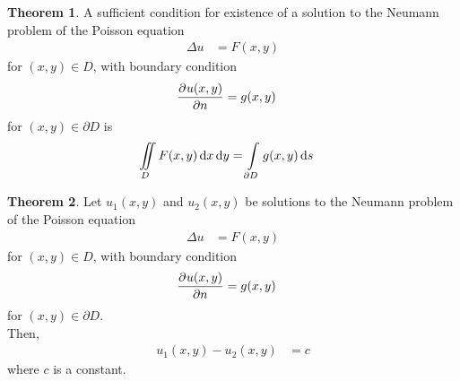 \documentclass[titlepage, fleqn, a4paper, 12pt, twoside]{article}
\theoremstyle{definition}
\theoremstyle{theorem}
\newtheorem{theorem}{Theorem}
\begin{document}
\begin{theorem}
	A sufficient condition for existence of a solution to the Neumann problem of the Poisson equation
	\begin{align*}
		\Delta u & = F(x,y)
	\end{align*}
	for $(x,y) \in D$, with boundary condition
	\begin{align*}
		\dpd{u(x,y)}{n} & = g(x,y)
	\end{align*}
	for $(x,y) \in \partial D$ is
	\begin{align*}
		\iint\limits_{D} F(x,y) \dif x \dif y & = \int\limits_{\partial D} g(x,y) \dif s
	\end{align*}
\end{theorem}

\begin{theorem}
	Let $u_1(x,y)$ and $u_2(x,y)$ be solutions to the Neumann problem of the Poisson equation
	\begin{align*}
		\Delta u & = F(x,y)
	\end{align*}
	for $(x,y) \in D$, with boundary condition
	\begin{align*}
		\dpd{u(x,y)}{n} & = g(x,y)
	\end{align*}
	for $(x,y) \in \partial D$.\\
	Then,
	\begin{align*}
		u_1(x,y) - u_2(x,y) & = c
	\end{align*}
	where $c$ is a constant.
\end{theorem}
\end{document}
